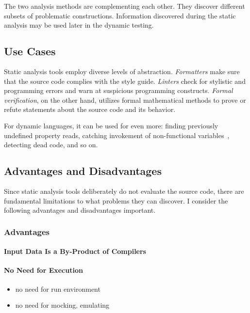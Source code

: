 The two analysis methods are complementing each other. They discover different subsets of problematic constructions. Information discovered during the static analysis may be used later in the dynamic testing.



\subsection{Use Cases}
Static analysis tools employ diverse levels of abstraction. \emph{Formatters} make sure that the source code complies with the style guide. \emph{Linters} check for stylistic and programming errors and warn at suspicious programming constructs. \emph{Formal verification}, on the other hand, utilizes formal mathematical methods to prove or refute statements about the source code and its behavior.

For dynamic languages, it can be used for even more: finding previously undefined property reads, catching invokement of non-functional variables~\cite{jensen_type_2009}, detecting dead code, and so on.

\subsection{Advantages and Disadvantages}

Since static analysis tools deliberately do not evaluate the source code, there are fundamental limitations to what problems they can discover. I consider the following advantages and disadvantages important.


\subsubsection{Advantages}
\paragraph{Input Data Is a By-Product of Compilers}

\paragraph{No Need for Execution}
\begin{itemize}
  \item no need for run environment
  \item no need for mocking, emulating
\end{itemize}

